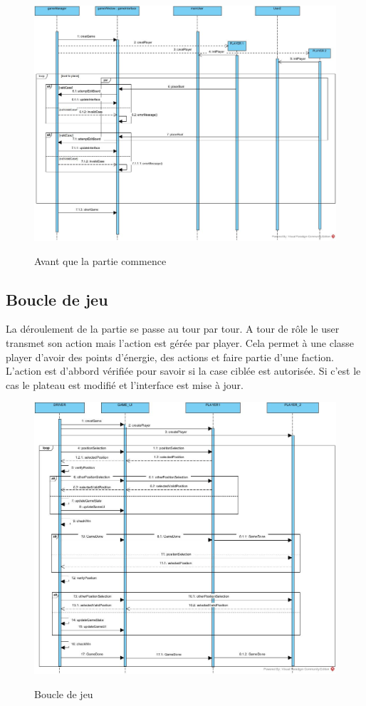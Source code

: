 \documentclass[../design_fonctionnement_sys.tex]{subfiles}
\begin{document}
\begin{figure}[H]
    \centering
    \includegraphics[scale=0.4]{img_design/PreGame.jpg}
    \label{fig:seq_match_server}
    \caption{Avant que la partie commence}
\end{figure}
\newpage

\subsection{Boucle de jeu}
La déroulement de la partie se passe au tour par tour. A tour de rôle le user transmet son action
mais l'action est gérée par player. Cela permet à une classe player d'avoir des points d'énergie, des actions et faire partie
d'une faction. L'action est d'abbord vérifiée pour savoir si la case ciblée est autorisée. Si c'est le cas le plateau
est modifié et l'interface est mise à jour.

\begin{figure}[H]
    \centering
    \includegraphics[scale=0.3]{img_design/Game.jpg}
    \label{fig:seq_gameloop_client}
    \caption{Boucle de jeu}
\end{figure}
\end{document}
